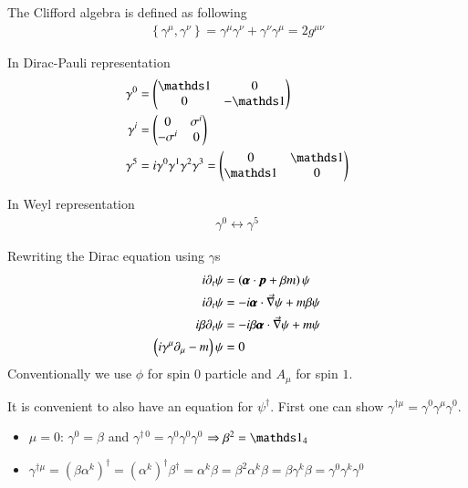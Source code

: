 The Clifford algebra is defined as following
\begin{align}
   \left\{ \gamma^\mu, \gamma^\nu \right\} = \gamma^\mu \gamma^\nu + \gamma^\nu \gamma^\mu = 2 g^{\mu\nu}
\end{align}

In Dirac-Pauli representation
\begin{align}
   \gamma^0 &= \begin{pmatrix} \id & 0 \\ 0 & -\id \end{pmatrix} \\
   \gamma^i &= \begin{pmatrix} 0 & \sigma^i \\ -\sigma^i & 0 \end{pmatrix} \\
   \gamma^5 &= i \gamma^0 \gamma^1 \gamma^2 \gamma^3 = \begin{pmatrix} 0 & \id \\ \id & 0\end{pmatrix}
\end{align}

In Weyl representation 
\begin{align*}
   \gamma^0 \leftrightarrow \gamma^5
\end{align*}

Rewriting the Dirac equation using $\gamma$s
\begin{align}
   i \partial_t \psi &= \left( \pmb{\alpha} \cdot \pmb{p} + \beta m  \right) \psi \notag\\
   i \partial_t \psi &= -i \pmb{\alpha} \cdot \vec{\nabla} \psi + m \beta \psi \notag\\
   i \beta \partial_t \psi &= -i \beta \pmb{\alpha} \cdot \vec{\nabla} \psi + m \psi \notag\\
   \left(i\gamma^\mu \partial_\mu - m \right) \psi &= 0
\end{align}
Conventionally we use $\phi$ for spin $0$ particle and $A_\mu$ for spin $1$.

It is convenient to also have an equation for $\psi^\dagger$. First one can show $\gamma^{\dagger\mu} = \gamma^0 \gamma^\mu \gamma^0$.
\begin{itemize}
   \item $\mu = 0$: $\gamma^0 = \beta$ and $\gamma^{\dagger\, 0} = \gamma^0 \gamma^0 \gamma^0$ $\Rightarrow \beta^2 = \id_4$
   \item $\gamma^{\dagger\mu} = (\beta \alpha^k)^\dagger = (\alpha^k)^\dagger \beta^\dagger = \alpha^k \beta = \beta^2 \alpha^k \beta = \beta \gamma^k \beta = \gamma^0 \gamma^k \gamma^0$
\end{itemize}


